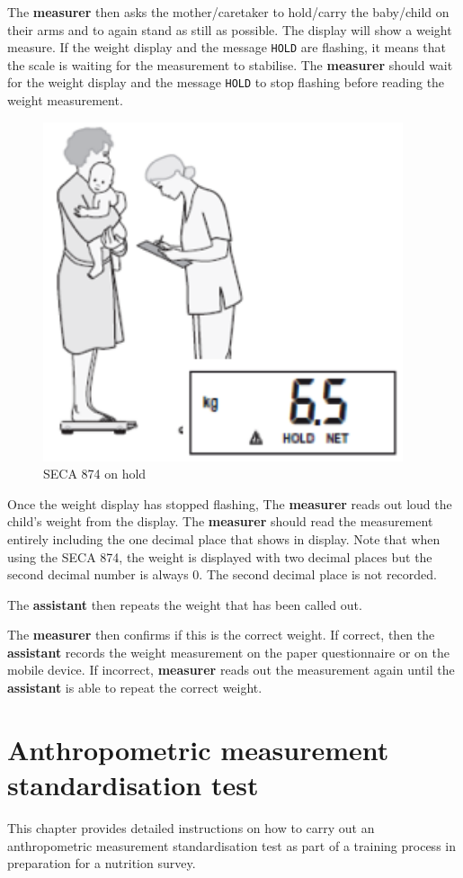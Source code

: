 \documentclass[12pt,]{book}
\begin{document}
The \textbf{measurer} then asks the mother/caretaker to hold/carry the
baby/child on their arms and to again stand as still as possible. The
display will show a weight measure. If the weight display and the
message \texttt{HOLD} are flashing, it means that the scale is waiting
for the measurement to stabilise. The \textbf{measurer} should wait for
the weight display and the message \texttt{HOLD} to stop flashing before
reading the weight measurement.

\begin{figure}

{\centering \includegraphics[width=4.17in]{images/seca874hold} 

}

\caption{SECA 874 on hold}\label{fig:unnamed-chunk-12}
\end{figure}

Once the weight display has stopped flashing, The \textbf{measurer}
reads out loud the child's weight from the display. The
\textbf{measurer} should read the measurement entirely including the one
decimal place that shows in display. Note that when using the SECA 874,
the weight is displayed with two decimal places but the second decimal
number is always 0. The second decimal place is not recorded.

The \textbf{assistant} then repeats the weight that has been called out.

The \textbf{measurer} then confirms if this is the correct weight. If
correct, then the \textbf{assistant} records the weight measurement on
the paper questionnaire or on the mobile device. If incorrect,
\textbf{measurer} reads out the measurement again until the
\textbf{assistant} is able to repeat the correct weight.

\hypertarget{standard}{%
\chapter{Anthropometric measurement standardisation
test}\label{standard}}

This chapter provides detailed instructions on how to carry out an
anthropometric measurement standardisation test as part of a training
process in preparation for a nutrition survey.


\end{document}
